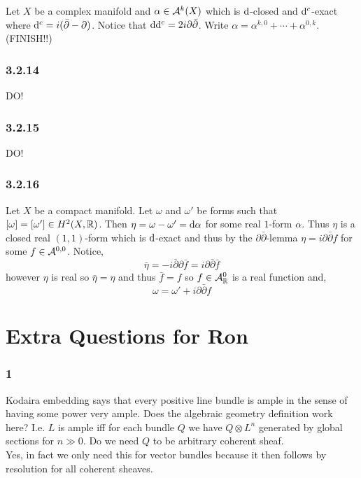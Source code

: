 \documentclass[12pt]{article}
\begin{document}
Let $X$ be a complex \kahler manifold and $\alpha \in \mathcal{A}^k(X)$ which is $\mathrm{d}$-closed and $\mathrm{d}^c$-exact where $\mathrm{d}^c = i (\bar{\partial} - \partial)$. Notice that $\mathrm{d} \mathrm{d}^c = 2 i \partial \bar{\partial}$. Write $\alpha = \alpha^{k,0} + \cdots + \alpha^{0, k}$. (FINISH!!)

\subsubsection{3.2.14}

DO! 

\subsubsection{3.2.15}

DO!

\subsubsection{3.2.16}

Let $X$ be a compact \kahler manifold. Let $\omega$ and $\omega'$ be \kahler forms such that $[\omega] = [\omega'] \in H^2(X, \mathbb{R})$. Then $\eta = \omega - \omega' = \mathrm{d}{\alpha}$ for some real $1$-form $\alpha$. Thus $\eta$ is a closed real $(1,1)$-form which is $\mathrm{d}$-exact and thus by the $\partial \bar{\partial}$-lemma $\eta = i \partial \bar{\partial} f$ for some $f \in \mathcal{A}^{0,0}$. Notice,
\[ \bar{\eta} = - i \bar{\partial} \partial \bar{f} = i \partial \bar{\partial} \bar{f} \]
however $\eta$ is real so $\bar{\eta} = \eta$ and thus $\bar{f} = f$ so $f \in \mathcal{A}^0_{\mathbb{R}}$ is a real function and,
\[ \omega = \omega' + i \partial \bar{\partial} f \]

\section{Extra Questions for Ron}

\subsubsection{1}

Kodaira embedding says that every positive line bundle is ample in the sense of having some power very ample. Does the algebraic geometry definition work here? I.e. $L$ is ample iff for each bundle $Q$ we have $Q \otimes L^n$ generated by global sections for $n \gg 0$. Do we need $Q$ to be arbitrary coherent sheaf.
\\
Yes, in fact we only need this for vector bundles because it then follows by resolution for all coherent sheaves.
\end{document}
